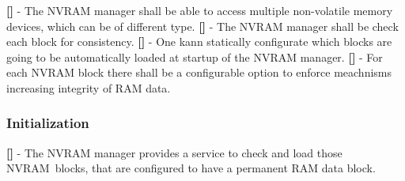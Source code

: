 \newline
{\bf []} - The NVRAM manager shall be able to access multiple non-volatile memory devices, which can be of different type.\newline
\newline
{\bf []} - The NVRAM manager shall be check each block for consistency.\newline
\newline
{\bf []} - One kann statically configurate which blocks are going to be automatically loaded at startup of the NVRAM manager.\newline
\newline
{\bf []} - For each NVRAM block there shall be a configurable option to enforce meachnisms increasing integrity of \mbox{RAM} data.\newline
\newline
\subsubsection{Initialization}
{\bf []} - The \mbox{NVRAM} manager provides a service to check and load those \mbox{NVRAM blocks}, that are configured to have a permanent \mbox{RAM} data block.\newline
\newline
